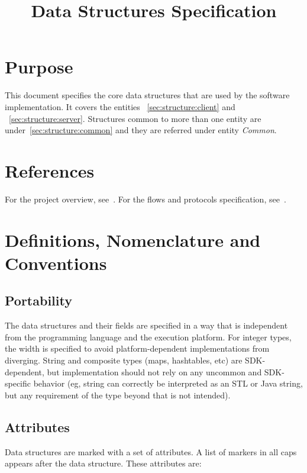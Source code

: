 \documentclass[a4paper,10pt,draft]{article}
\title{\longProduct{} Data Structures Specification}
\author{\yannis}
\newcommand{\common}{{\em Common}}
\begin{document}
\maketitle
\tableofcontents

\section{Purpose}
This document specifies the core data structures that are used by the \shortProduct{} software implementation. It covers the entities \client{}~\ref{sec:structure:client} and 
\server{}~\ref{sec:structure:server}. Structures common to more than one entity are under~\ref{sec:structure:common} and they are referred under entity \common{}.

\section{References}
For the project overview, see~\cite{project_spec}. For the flows and protocols specification, see~\cite{flow_spec}.

\section{Definitions, Nomenclature and Conventions}

\subsection{Portability}
The data structures and their fields are specified in a way that is independent from the programming language and the execution platform. For integer types, the width is specified 
to avoid platform-dependent implementations from diverging. String and composite types (maps, hashtables, etc) are SDK-dependent, but implementation should not rely on any uncommon 
and SDK-specific behavior (eg, string can correctly be interpreted as an STL or Java string, but any requirement of the type beyond that is not intended).

\subsection{Attributes}
Data structures are marked with a set of attributes. A list of markers in all caps appears after the data structure. These attributes are:

\newcommand{\persistent}{\MakeUppercase{persistent}}
\newcommand{\ephemeral}{\MakeUppercase{ephemeral}}
\newcommand{\secure}{\MakeUppercase{secure}}
\newcommand{\unsecure}{\MakeUppercase{unsecure}}
\newcommand{\infrastructure}{\MakeUppercase{infrastructure}}
\newcommand{\unique}{\MakeUppercase{unique}}
\end{document}
